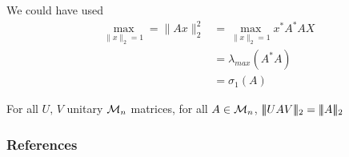 \documentclass[aspectratio=169]{beamer}
\begin{document}
\begin{frame}
We could have used 
\begin{align*}
\max_{\|x\|_2=1}=\|Ax\|_2^2&= \max_{\|x\|_2=1}x^*A^*AX\\
&= \lambda_{max}(A^*A)\\
&= \sigma_1(A)
\end{align*}


\begin{remark}
	For all $U,\, V$ unitary $\mathcal{M}_{n}$ matrices, for all $A\in \mathcal{M}_n$, $\tripbar UAV\tripbar_2= \tripbar A\tripbar_2$
\end{remark}
\end{frame}



\begin{frame}[allowframebreaks]
    \frametitle{References}
    
    
\end{frame}
    
\end{document}
